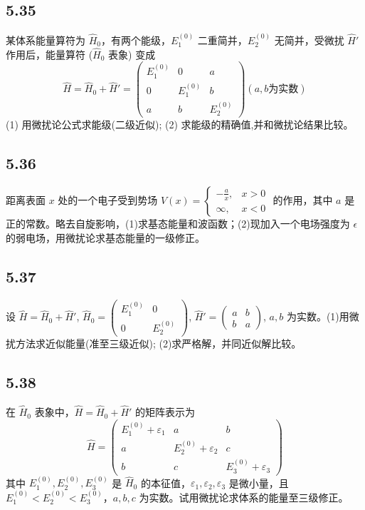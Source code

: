 \subsection{5.35}
某体系能量算符为 $\hat{H}_0$，有两个能级，$E_1^{(0)}$ 二重简并，$E_2^{(0)}$ 无简并，受微扰 $\hat{H}'$ 作用后，能量算符 ($\hat{H}_0$ 表象) 变成
$$\hat{H} = \hat{H}_0 + \hat{H}' = \begin{pmatrix} E_1^{(0)} & 0 & a \\ 0 & E_1^{(0)} & b \\ a & b & E_2^{(0)} \end{pmatrix} (a, b \text{为实数})$$
(1) 用微扰论公式求能级(二级近似); (2) 求能级的精确值,并和微扰论结果比较。

\subsection{5.36}
距离表面 $x$ 处的一个电子受到势场 $V(x) = \begin{cases} -\frac{a}{x}, & x > 0 \\ \infty, & x < 0 \end{cases}$ 的作用，其中 $a$ 是正的常数。略去自旋影响，(1)求基态能量和波函数；(2)现加入一个电场强度为 $\epsilon$ 的弱电场，用微扰论求基态能量的一级修正。

\subsection{5.37}
设 $\hat{H} = \hat{H}_0 + \hat{H}'$, $\hat{H}_0 = \begin{pmatrix} E_1^{(0)} & 0 \\ 0 & E_2^{(0)} \end{pmatrix}$, $\hat{H}' = \begin{pmatrix} a & b \\ b & a \end{pmatrix}$, $a,b$ 为实数。(1)用微扰方法求近似能量(准至三级近似); (2)求严格解，并同近似解比较。

\subsection{5.38}
在 $\hat{H}_0$ 表象中，$\hat{H} = \hat{H}_0 + \hat{H}'$ 的矩阵表示为
$$\hat{H} = \begin{pmatrix} E_1^{(0)} + \varepsilon_1 & a & b \\ a & E_2^{(0)} + \varepsilon_2 & c \\ b & c & E_3^{(0)} + \varepsilon_3 \end{pmatrix}$$
其中 $E_1^{(0)}, E_2^{(0)}, E_3^{(0)}$ 是 $\hat{H}_0$ 的本征值，$\varepsilon_1, \varepsilon_2, \varepsilon_3$ 是微小量，且 $E_1^{(0)} < E_2^{(0)} < E_3^{(0)}$，$a, b, c$ 为实数。试用微扰论求体系的能量至三级修正。

